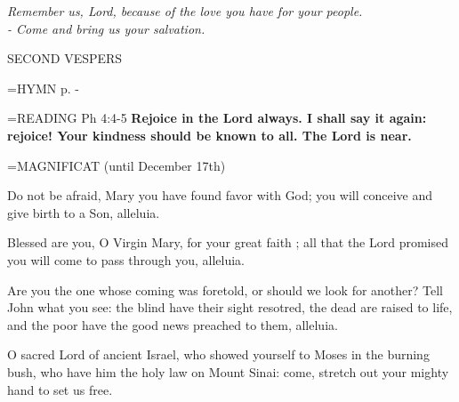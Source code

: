 \begin{center}
\textit{Remember us, Lord, because of the love you have for your people.\\
- Come and bring us your salvation.}
\end{center}

\begin{flushleft}\normalsize SECOND VESPERS\\\end{flushleft}

\hangindent=\parindent \small{\uppercase{HYMN} p. \pageref{advent:firstHymn}-\pageref{advent:lastHymn}\\}

\hangindent=\parindent \small{\uppercase{READING}} Ph 4:4-5 \textbf{ Rejoice in the Lord always. I shall say it again: rejoice! Your kindness should be known to all. The Lord is near.\\}

\hangindent=\parindent \small MAGNIFICAT (until December 17th)
\begin{description}[labelindent=\parindent, leftmargin=*]
\item [Week 1:]  Do not be afraid, Mary you have found favor with God; you will conceive and give birth to a Son, alleluia.
\item [Week 2:]  Blessed are you, O Virgin Mary, for your great faith ; all that the Lord promised you will come to pass through you, alleluia.
\item [Week 3:]  Are you the one whose coming was foretold, or should we look for another? Tell John what you see: the blind have their sight resotred, the dead are raised to life, and the poor have the good news preached to them, alleluia.
\item [(December 18th):]  O sacred Lord of ancient Israel, who showed yourself to Moses in the burning bush, who have him the holy law on Mount Sinai: come, stretch out your mighty hand to set us free.
\end{description}
